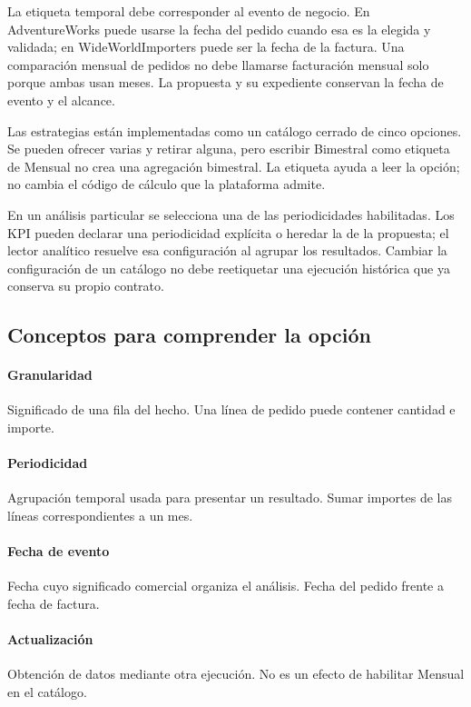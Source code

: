La etiqueta temporal debe corresponder al evento de negocio. En AdventureWorks puede usarse la fecha del pedido cuando esa es la elegida y validada; en WideWorldImporters puede ser la fecha de la factura. Una comparación mensual de pedidos no debe llamarse facturación mensual solo porque ambas usan meses. La propuesta y su expediente conservan la fecha de evento y el alcance.

Las estrategias están implementadas como un catálogo cerrado de cinco opciones. Se pueden ofrecer varias y retirar alguna, pero escribir Bimestral como etiqueta de Mensual no crea una agregación bimestral. La etiqueta ayuda a leer la opción; no cambia el código de cálculo que la plataforma admite.

En un análisis particular se selecciona una de las periodicidades habilitadas. Los KPI pueden declarar una periodicidad explícita o heredar la de la propuesta; el lector analítico resuelve esa configuración al agrupar los resultados. Cambiar la configuración de un catálogo no debe reetiquetar una ejecución histórica que ya conserva su propio contrato.

\subsection{Conceptos para comprender la opción}
\paragraph{Granularidad} Significado de una fila del hecho. Una línea de pedido puede contener cantidad e importe.

\paragraph{Periodicidad} Agrupación temporal usada para presentar un resultado. Sumar importes de las líneas correspondientes a un mes.

\paragraph{Fecha de evento} Fecha cuyo significado comercial organiza el análisis. Fecha del pedido frente a fecha de factura.

\paragraph{Actualización} Obtención de datos mediante otra ejecución. No es un efecto de habilitar Mensual en el catálogo.


